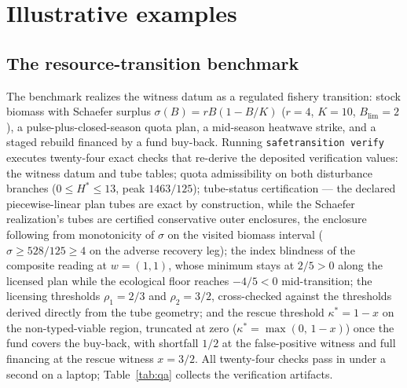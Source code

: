 \documentclass[3p,11pt]{elsarticle}
\begin{document}
\section{Illustrative examples}\label{sec:examples}

\subsection{The resource-transition benchmark}\label{sec:benchmark}

The benchmark realizes the witness datum as a regulated fishery transition:
stock biomass with Schaefer surplus $\sigma(B) = rB(1 - B/K)$ ($r = 4$,
$K = 10$, $B_{\mathrm{lim}} = 2$), a pulse-plus-closed-season quota plan,
a mid-season heatwave strike, and a staged rebuild financed by a fund
buy-back. Running \texttt{safetransition verify} executes twenty-four exact
checks that re-derive the deposited verification values: the witness datum
and tube tables; quota admissibility on both disturbance branches
($0 \leq H^* \leq 13$, peak $1463/125$); tube-status certification --- the
declared piecewise-linear plan tubes are exact by construction, while the
Schaefer realization's tubes are certified conservative outer enclosures,
the enclosure following from monotonicity of $\sigma$ on the visited
biomass interval ($\sigma \geq 528/125 \geq 4$ on the adverse recovery
leg); the
index blindness of the composite reading at $w = (1, 1)$, whose minimum
stays at $2/5 > 0$ along the licensed plan while the ecological floor
reaches $-4/5 < 0$ mid-transition; the licensing thresholds
$\rho_1 = 2/3$ and $\rho_2 = 3/2$, cross-checked against the thresholds
derived directly from the tube geometry; and the rescue threshold
$\kappa^* = 1 - x$ on the non-typed-viable region, truncated at zero
($\kappa^* = \max(0,\, 1-x)$) once the fund covers the buy-back, with
shortfall $1/2$ at the false-positive witness and full financing at the
rescue witness $x = 3/2$. All twenty-four checks pass in under a second on a laptop;
Table~\ref{tab:qa} collects the verification artifacts.
\end{document}
